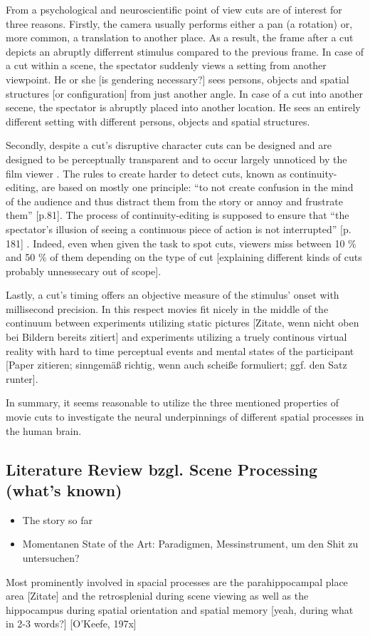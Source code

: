 \documentclass[10pt,a4paper,twocolumn]{article}
\begin{document}
From a psychological and neuroscientific point of view cuts are of
interest for three reasons. Firstly, the camera usually performs either
a pan (a rotation) or, more common, a translation to another place.
As a result, the frame after a cut depicts an abruptly differrent
stimulus compared to the previous frame. In case of a cut within a
scene, the spectator suddenly views a setting from another viewpoint.
He or she {[}is gendering necessary?{]} sees persons, objects and
spatial structures {[}or configuration{]} from just another angle.
In case of a cut into another secene, the spectator is abruptly placed
into another location. He sees an entirely different setting with
different persons, objects and spatial structures. 

Secondly, despite a cut's disruptive character cuts can be designed
and are designed to be perceptually transparent and to occur largely
unnoticed by the film viewer \citep{cutting_2011_changing_poetics_of_dissolve}.
The rules to create harder to detect cuts, known as continuity-editing,
are based on mostly one principle: ``to not create confusion in the
mind of the audience and thus distract them from the story or annoy
and frustrate them'' {[}p.81{]}\citep{brown_2012_cinematography}.
The process of continuity-editing is supposed to ensure that \textquotedblleft the
spectator\textquoteright s illusion of seeing a continuous piece of
action is not interrupted\textquotedblright{} {[}p. 181{]} \citep{reisz_millar_2009_film_editing}.
Indeed, even when given the task to spot cuts, viewers miss between
10 \% and 50 \% of them depending on the type of cut \citep{smith_2008_edit_blindness}
{[}explaining different kinds of cuts probably unnessecary out of
scope{]}.

Lastly, a cut's timing offers an objective measure of the stimulus'
onset with millisecond precision. In this respect movies fit nicely
in the middle of the continuum between experiments utilizing static
pictures {[}Zitate, wenn nicht oben bei Bildern bereits zitiert{]}
and experiments utilizing a truely continous virtual reality with
hard to time perceptual events and mental states of the participant
{[}Paper zitieren; sinngemäß richtig, wenn auch scheiße formuliert;
ggf. den Satz runter{]}. 

In summary, it seems reasonable to utilize the three mentioned properties
of movie cuts to investigate the neural underpinnings of different
spatial processes in the human brain.


\subsection{Literature Review bzgl. Scene Processing (what's known)}
\begin{itemize}
	\item The story so far 
	\item Momentanen State of the Art: Paradigmen, Messinstrument, um den Shit
	zu untersuchen? 
\end{itemize}
Most prominently involved in spacial processes are the parahippocampal
place area {[}Zitate{]} and the retrosplenial during scene viewing
as well as the hippocampus during spatial orientation and spatial
memory {[}yeah, during what in 2-3 words?{]} {[}O'Keefe, 197x{]} 
\end{document}

